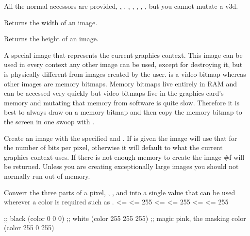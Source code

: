 All the normal  accessors are provided, , , , , , , , but you cannot mutate a v3d.


Returns the width of an image.


Returns the height of an image.



A special image that represents the current graphics context. This image can be used in every context any other image can be used, except for destroying it, but  is physically different from images created by the user.  is a video bitmap whereas other images are memory bitmaps. Memory bitmaps live entirely in RAM and can be accessed very quickly but video bitmaps live in the graphics card's memory and mutating that memory from software is quite slow. Therefore it is best to always draw on a memory bitmap and then copy the memory bitmap to the screen in one swoop with .


Create an image with the specified  and . If  is given the image will use that for the number of bits per pixel, otherwise it will default to what the current graphics context uses. If there is not enough memory to create the image #f will be returned. Unless you are creating exceptionally large images you should not normally run out of memory.


Convert the three parts of a pixel, , , and  into a single value that can be used wherever a color is required such as .
 <=  <= 255 <=  <= 255 <=  <= 255\newline

\begin{schemedisplay}
;; black
(color 0 0 0)
;; white
(color 255 255 255)
;; magic pink, the masking color
(color 255 0 255)
\end{schemedisplay}

